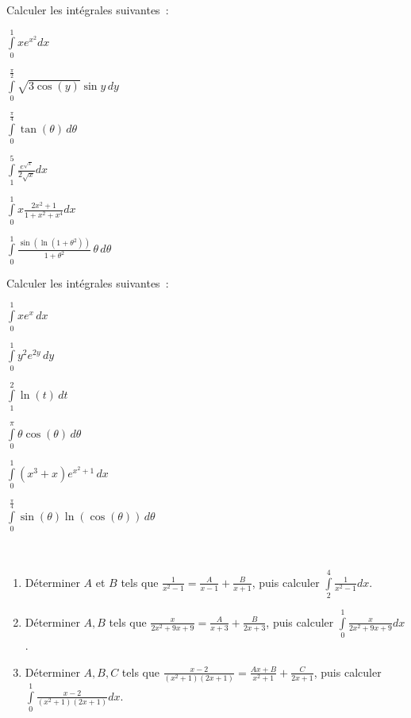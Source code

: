 \begin{exo} Calculer les intégrales suivantes~:
    \begin{examplescol}{3}
        \item $\int \limits _{0} ^{1} xe^{x^{2}}dx$
        \item $\int \limits _{0} ^{\frac{\pi}{2}} \sqrt{3\cos(y)}\sin{y} \,dy$
        \item $\int \limits _{0} ^{\frac{\pi}{4}} \tan(\theta) \,d\theta$
        \item $\int \limits _{1} ^{5} \frac{e^{\sqrt{x}}}{2\sqrt{x}}dx$
        \item $\int \limits _{0} ^{1} x\frac{2x^{2}+1}{1+x^{2}+x^{4}} dx$
        \item $\int \limits _{0} ^{1}  \frac{\sin(\ln(1+\theta^{2}))}{1+\theta^{2}}\, \theta\, d\theta$
    \end{examplescol}
\end{exo}


\begin{exo} Calculer les intégrales suivantes~:
    \begin{examplescol}{3}
		\item $\int \limits _{0} ^{1} xe^{x}\,dx$ 
		\item $\int \limits _{0} ^{1} y^{2}e^{2y} \,dy$
		\item $\int \limits _{1} ^{2} \ln(t) \,dt$  
		\item $\int \limits _{0} ^{\pi} \theta \cos(\theta) \,d\theta$
		\item $\int \limits _{0} ^{1} (x^{3}+x)e^{x^{2}+1} \,dx$
		\item $\int \limits _{0} ^{\frac{\pi}{4}}  \sin(\theta)\ln(\cos(\theta)) \, d\theta$
    \end{examplescol}
\end{exo}

\begin{exo}\
    \begin{enumerate}
        \item Déterminer $A$ et $B$ tels que $\frac{1}{x^{2}-1} = \frac{A}{x-1}+\frac{B}{x+1}$, puis calculer $\int \limits _{2} ^{4} \frac{1}{x^{2}-1} dx$.
        \item Déterminer $A, B$ tels que $\frac{x}{2x^{2}+9x+9} = \frac{A}{x+3}+\frac{B}{2x+3}$, puis calculer $\int \limits _{0} ^{1} \frac{x}{2x^{2}+9x+9}dx$.
        \item Déterminer $A, B, C$ tels que $\frac{x-2}{(x^{2}+1)(2x+1)} = \frac{Ax+B}{x^{2}+1}+\frac{C}{2x+1}$, puis calculer
        $\int \limits _{0} ^{1} \frac{x-2}{(x^{2}+1)(2x+1)}  dx$.
    \end{enumerate}
\end{exo}


